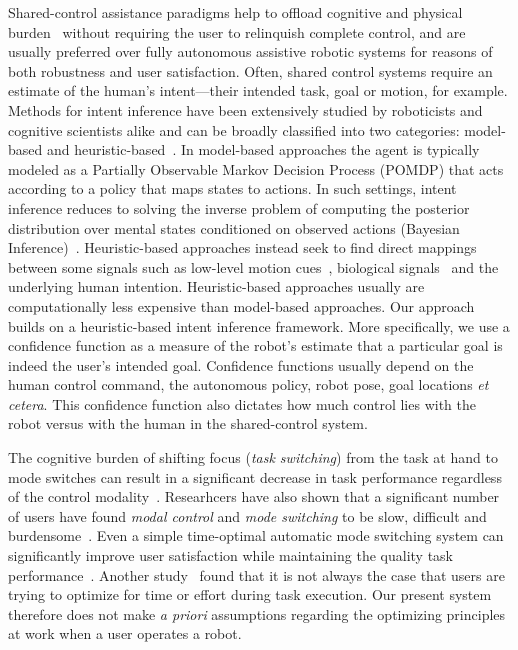 \documentclass[conference]{IEEEtran}
\begin{document}
Shared-control assistance paradigms help to offload cognitive and physical burden~\cite{volosyak2005rehabilitation} without requiring the user to relinquish complete control, and are usually preferred over fully autonomous assistive robotic systems for reasons of both robustness and user satisfaction. Often, shared control systems require an estimate of the human's intent---their intended task, goal or motion, for example. Methods for intent inference have been extensively studied by roboticists and cognitive scientists alike and can be broadly classified into two categories: model-based and heuristic-based~\cite{baker2017rational}. In model-based approaches the agent is typically modeled as a Partially Observable Markov Decision Process (POMDP) that acts according to a policy that maps states to actions. In such settings, intent inference reduces to solving the inverse problem of computing the posterior distribution over mental states conditioned on observed actions (Bayesian Inference)~\cite{baker2007goal,baker2009action}. Heuristic-based approaches instead seek to find direct mappings between some signals such as low-level motion cues~\cite{barrett2005accurate}, biological signals~\cite{donoghue2002connecting} and the underlying human intention. Heuristic-based approaches usually are computationally less expensive than model-based approaches. Our approach builds on a heuristic-based intent inference framework. More specifically, we use a confidence function as a measure of the robot's estimate that a particular goal is indeed the user's intended goal. Confidence functions usually depend on the human control command, the autonomous policy, robot pose, goal locations \textit{et cetera}. This confidence function also dictates how much control lies with the robot versus with the human in the shared-control system. 

The cognitive burden of shifting focus (\textit{task switching})  from the task at hand to mode switches can result in a significant decrease in task performance regardless of the control modality~\cite{monsell2003task}. Researhcers have also shown that a significant number of users have found \textit{modal control} and \textit{mode switching} to be slow, difficult and burdensome~\cite{herlant2016assistive}. Even a simple time-optimal automatic mode switching system can significantly improve user satisfaction while maintaining the quality task performance~\cite{herlant2016assistive}.  Another study~\cite{gopinath2017human} found that it is not always the case that users are trying to optimize for time or effort during task execution. Our present system therefore does not make \textit{a priori} assumptions regarding the optimizing principles at work when a user operates a robot.
\end{document}
